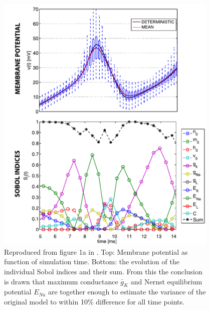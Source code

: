 \documentclass{beamer}
\begin{document}
\begin{frame}[t, fragile]
  \vspace*{5ex}

  \begin{columns}[onlytextwidth,T]
    \begin{column}{0.36\textwidth}
      
      \begin{figure}[htp]
        \centering
        \includegraphics[width=\textwidth]{fig1a}
          \caption{Reproduced from figure 1a in \citeauthor{TorresValderrama2015} \citeyear{TorresValderrama2015}.
          Top: Membrane potential as function of simulation time. Bottom: the evolution of
          the individual Sobol indices and their sum. From this the conclusion is drawn that
          maximum conductance $\bar{g}_{K}$ and Nernst equilibrium potential $E_{Na}$ are
          together enough to estimate the variance of the original model to within 10\%
          difference for all time points.}
          \label{orig}
      \end{figure}

    \end{column}
    \begin{column}{0.63\textwidth}
      

\end{column}
\end{columns}
\end{frame}
\end{document}
